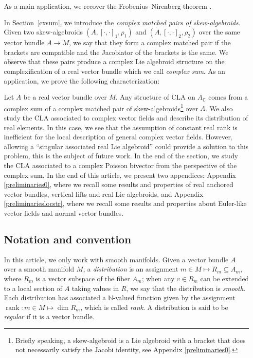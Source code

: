 \documentclass[pdftex]{sigma}
\numberwithin{equation}{section}
\newenvironment{customthm}[1]
{\renewcommand\theinnercustomthm{#1}\innercustomthm}
{\endinnercustomthm}
\newcommand{\C}{{\mathbb{C}}}
\DeclareMathOperator{\rk}{rank}
\begin{document}
As a main application, we recover the Frobenius--Nirenberg theorem \cite[Theorem 1]{nirenberg1958complex}.


In Section~\ref{cxsum}, we introduce the {\em complex matched pairs of skew-algebroids}. Given two skew-algebroids $(A, [\cdot,\cdot]_1, \rho_1)$ and $(A, [\cdot,\cdot]_2, \rho_2)$ over the same vector bundle $A\to M$, we say that they form a complex matched pair if the brackets are compatible and the Jacobiator of the brackets is the same. We observe that these pairs produce a complex Lie algebroid structure on the complexification of a real vector bundle which we call {\em complex sum}. As an application, we prove the following characterization:
 \begin{customthm}{5.6}

 Let $A$ be a real vector bundle over $M$. Any structure of CLA on $A_{\C}$ comes from a complex sum of a complex matched pair of skew-algebroids\footnote{Briefly speaking, a skew-algebroid is a Lie algebroid with a bracket that does not necessarily satisfy the Jacobi identity, see Appendix \ref{preliminaries0}.} over $A$.
\end{customthm}
We also study the CLA associated to complex vector fields and describe its distribution of real elements. In this case, we see that the assumption of constant real rank is inefficient for the local description of general complex vector fields. However, allowing a ``singular associated real Lie algebroid'' could provide a solution to this problem, this is the subject of future work. In the end of the section, we study the CLA associated to a complex Poisson bivector from the perspective of the complex sum.
In the end of this article, we present two appendices: Appendix \ref{preliminaries0}, where we recall some results and properties of real anchored vector bundles, vertical lifts and real Lie algebroids, and Appendix \ref{preliminarieslocstr}, where we recall some results and properties about Euler-like vector fields and normal vector bundles.
\subsection*{Notation and convention}
In this article, we only work with smooth manifolds. Given a vector bundle $A$ over a smooth manifold $M$, a {\em distribution} is an assignment $m\in M\mapsto R_m\subseteq A_m$, where $R_m$ is a vector subspace of the fiber $A_m$; when any $v\in R_m$ can be extended to a local section of $A$ taking values in $R$, we say that the distribution is {\em smooth}. Each distribution has associated a $\mathbb{N}$-valued function given by the assignment $\rk\colon m\in M\mapsto\dim R_m$, which is called {\em rank}. A distribution is said to be {\em regular} if it is a vector bundle.
\end{document}
